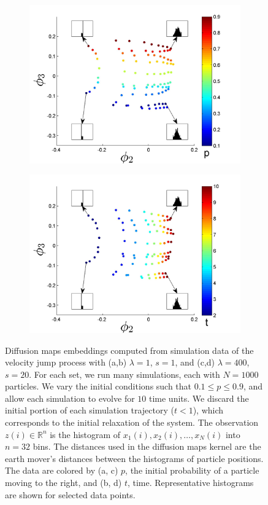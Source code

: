 \documentclass[preprint]{elsarticle}
\begin{document}
\begin{figure}[t!]
\begin{subfigure}{6cm}
\includegraphics[width=\textwidth]{EMD_withhist_p_400}
\caption{}
\label{subfig:large_lambda_p}
\end{subfigure}
\begin{subfigure}{6cm}
\includegraphics[width=\textwidth]{EMD_withhist_t_400}
\caption{}
\label{subfig:large_lambda_t}
\end{subfigure}
\caption{Diffusion maps embeddings computed from simulation data of the velocity jump process with (a,b) $\lambda=1$, $s=1$, and (c,d) $\lambda=400$, $s=20$.  For each set, we run many simulations, each with $N=1000$ particles.
%
We vary the initial conditions such that $0.1 \le p  \le 0.9$, and allow each simulation to evolve for $10$ time units.
%
We discard the initial portion of each simulation trajectory ($t < 1$), which corresponds to the initial relaxation of the system.
%
The observation $z(i) \in \mathbb{R}^n$ is the histogram of $x_1(i), x_2(i), \dots, x_N(i)$ into $n = 32$ bins.
%
The distances used in the diffusion maps kernel are the earth mover's distances between the histograms of particle positions. The data are colored by (a, c) $p$, the initial probability of a particle moving to the right, and (b, d) $t$, time. Representative histograms are shown for selected data points.}
\label{fig:dmaps_embed_emd}
\end{figure}
\end{document}
